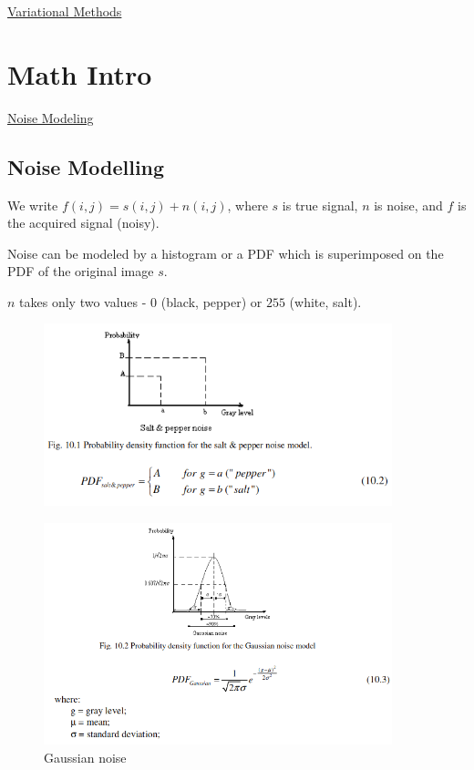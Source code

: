 \documentclass{article}
\begin{document}
\begin{center}
{\huge \underline{Variational Methods}}
\end{center}
\tableofcontents
\section*{Math Intro}
\href{https://users.utcluj.ro/~rdanescu/PI-L10e.pdf}{Noise Modeling}

\subsection*{Noise Modelling}
We write $f(i,j) = s(i,j)+n(i,j)$, where $s$ is true signal, $n$ is noise, and $f$ is the acquired signal (noisy). 

Noise can be modeled by a histogram or a PDF which is superimposed on the PDF of the original image $s$. 
\begin{definition}  $n$ takes only two values - $0$ (black, pepper) or $255$ (white, salt). 
\begin{figure}[H] \centering \includegraphics[height=0.2\textheight,width=0.9\textwidth,keepaspectratio]{saltAndPepperNoise}  \label{fig:saltAndPepperNoise} \end{figure}
\end{definition}

\begin{definition} 
\begin{figure}[H] \centering \includegraphics[height=0.3\textheight,width=0.9\textwidth,keepaspectratio]{gaussianNoise} \caption{Gaussian noise} \label{fig:gaussianNoise} \end{figure}
\end{definition}
\end{document}
